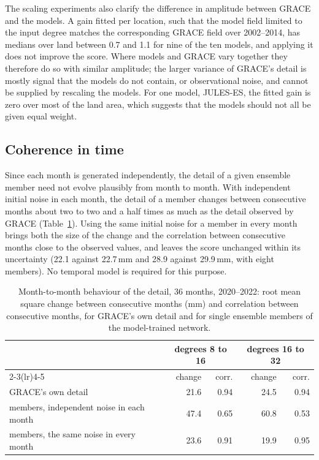 \documentclass[11pt,a4paper]{article}
\begin{document}
The scaling experiments also clarify the difference in amplitude between GRACE and the models.
A gain fitted per location, such that the model field limited to the input degree matches the
corresponding GRACE field over 2002--2014, has medians over land between 0.7 and 1.1 for nine
of the ten models, and applying it does not improve the score. Where models and GRACE vary
together they therefore do so with similar amplitude; the larger variance of GRACE's detail is
mostly signal that the models do not contain, or observational noise, and cannot be supplied
by rescaling the models. For one model, JULES-ES, the fitted gain is zero over most of the land
area, which suggests that the models should not all be given equal weight.

\subsection{Coherence in time}\label{sec:time}
Since each month is generated independently, the detail of a given ensemble member need not
evolve plausibly from month to month. With independent initial noise in each month, the detail
of a member changes between consecutive months about two to two and a half times as much as
the detail observed by GRACE (Table~\ref{tab:time}). Using the same initial noise for a member
in every month brings both the size of the change and the correlation between consecutive
months close to the observed values, and leaves the score unchanged within its uncertainty
(22.1 against 22.7\,mm and 28.9 against 29.9\,mm, with eight members). No temporal model is
required for this purpose.

\begin{table}[ht]
\centering\small
\caption{Month-to-month behaviour of the detail, 36 months, 2020--2022: root mean square change
between consecutive months (mm) and correlation between consecutive months, for GRACE's own
detail and for single ensemble members of the model-trained network.}
\label{tab:time}
\begin{tabular}{lrrrr}
  \toprule
  & \multicolumn{2}{c}{degrees 8 to 16} & \multicolumn{2}{c}{degrees 16 to 32} \\
  \cmidrule(lr){2-3}\cmidrule(lr){4-5}
  & change & corr. & change & corr. \\
  \midrule
  GRACE's own detail & 21.6 & 0.94 & 24.5 & 0.94 \\
  members, independent noise in each month & 47.4 & 0.65 & 60.8 & 0.53 \\
  members, the same noise in every month & 23.6 & 0.91 & 19.9 & 0.95 \\
  \bottomrule
\end{tabular}
\end{table}
\end{document}
